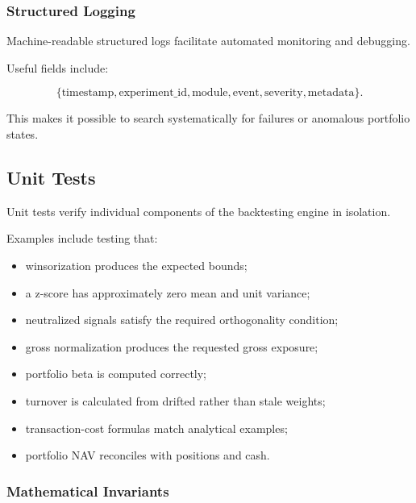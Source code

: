 \documentclass[11pt,a4paper]{article}
\begin{document}
\subsubsection{Structured Logging}

Machine-readable structured logs facilitate automated monitoring and debugging.

Useful fields include:

\begin{equation}
\boxed{
\{
\text{timestamp},
\text{experiment\_id},
\text{module},
\text{event},
\text{severity},
\text{metadata}
\}.
}
\end{equation}

This makes it possible to search systematically for failures or anomalous
portfolio states.


\subsection{Unit Tests}
\label{subsec:unit_tests}

Unit tests verify individual components of the backtesting engine in isolation.

Examples include testing that:

\begin{itemize}
    \item winsorization produces the expected bounds;
    \item a z-score has approximately zero mean and unit variance;
    \item neutralized signals satisfy the required orthogonality condition;
    \item gross normalization produces the requested gross exposure;
    \item portfolio beta is computed correctly;
    \item turnover is calculated from drifted rather than stale weights;
    \item transaction-cost formulas match analytical examples;
    \item portfolio NAV reconciles with positions and cash.
\end{itemize}


\subsubsection{Mathematical Invariants}
\end{document}
